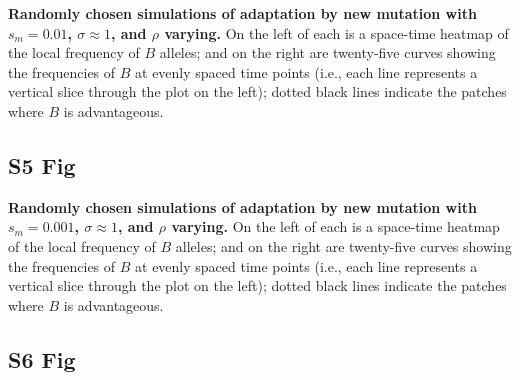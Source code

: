 \documentclass[10pt,letterpaper]{article}
\begin{document}
\textbf{Randomly chosen simulations of adaptation by new mutation
with $s_m=0.01$, $\sigma\approx 1$, and $\rho$ varying.}
    On the left of each is a space-time heatmap of the local frequency of $B$ alleles;
    and on the right are twenty-five curves showing the frequencies of $B$ at evenly spaced time points
    (i.e., each line represents a vertical slice through the plot on the left);
    dotted black lines indicate the patches where $B$ is advantageous.


\subsection*{S5 Fig}
\label{sfig:sims_3}

\textbf{Randomly chosen simulations of adaptation by new mutation
with $s_m=0.001$, $\sigma\approx 1$, and $\rho$ varying.}
    On the left of each is a space-time heatmap of the local frequency of $B$ alleles;
    and on the right are twenty-five curves showing the frequencies of $B$ at evenly spaced time points
    (i.e., each line represents a vertical slice through the plot on the left);
    dotted black lines indicate the patches where $B$ is advantageous.


\subsection*{S6 Fig}
\label{sfig:sims_4}
\end{document}

